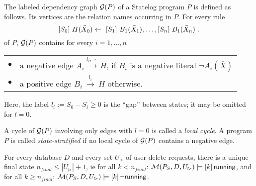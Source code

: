 \documentclass[twoside,11pt]{article}
\theoremstyle{lines}
\theoremstyle{longplain}
\begin{document}
\begin{Definition}\label{def:depgraph}   The labeled dependency
  graph $\mathcal G(P)$ of a Statelog program $P$ is defined as
  follows.  Its vertices are the relation names occurring in $P$.  For
  every rule
\[  \sterm{S_0}\ H(\bar X_0) \la\ 
   \sterm{S_1}\ B_1(\bar X_1),\ldots,\sterm{S_n}\ B_1(\bar X_n)~.  \]
%
   of $P$, $\mathcal G(P)$ contains for every $i=1,\dots,n$

   \noindent \begin{tabular}{ll}
     $\bullet$ & a negative edge $A_i \stackrel{l_i,
       \neg}{\rightarrow}\ H$, if $B_i$ is a negative literal $\neg
     A_i(\bar X)$\\ 
     $\bullet$ & a positive edge $B_i\ \stackrel{l_i}{\rightarrow}\ H$
     otherwise.
   \end{tabular} \smallskip 

   \noindent Here,  the label $l_i:= S_0 - S_i \ge 0$ is the ``gap'' between
   states; it may be omitted for $l=0$.

   A cycle of $\mathcal G(P)$ involving only edges with $l=0$ is
   called a \emph{local cycle\/}.  A program $P$ is called
   \emph{state-stratified\/} if no local cycle of $\mathcal G(P)$
   contains a negative edge.
\end{Definition}
%
\begin{Theorem}[Termination]\label{StatelogTermination}
For every database $D$ and every set $U_\rhd$ of user delete
  requests, there is a unique final state $n_{final} \leq |U_\rhd|+1$,
  ie for all $k<n_{final}$: $\mathcal M(P_S,D,U_\rhd) \models
  [k]\,\textsf{running}$, and for all $k \ge n_{final}$: $\mathcal
  M(P_S,D,U_\rhd) \models [k]\, \lnot \textsf{running}$.
\end{Theorem}
\end{document}
